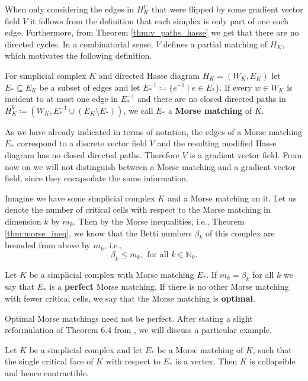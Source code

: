 When only considering the edges in $H_K^V$ that were flipped by some gradient vector field $V$ it follows from the definition that each simplex is only part of one such edge. Furthermore, from Theorem \ref{thm:v_paths_hasse} we get that there are no directed cycles. In a combinatorial sense, $V$ defines a partial matching of $H_K$, which motivates the following definition.

\begin{defi}
For simplicial complex $K$ and directed Hasse diagram $H_K = (W_K, E_K)$ let $E_* \subseteq E_K$ be a subset of edges and let $E_*^{-1} \coloneqq \{e^{-1} \mid e \in E_*\}$. If every $w \in W_K$ is incident to at most one edge in $E_*^{-1}$ and there are no closed directed paths in $H_K^V \coloneqq (W_K, E_*^{-1} \cup (E_K \setminus E_*) )$, we call $E_*$ a \textbf{Morse matching} of $K$.
\end{defi}

As we have already indicated in terms of notation, the edges of a Morse matching $E_*$ correspond to a discrete vector field $V$ and the resulting modified Hasse diagram has no closed directed paths. Therefore $V$ is a gradient vector field. From now on we will not distinguish between a Morse matching and a gradient vector field, since they encapsulate the same information. 

Imagine we have some simplicial complex $K$ and a Morse matching on it. Let us denote the number of critical cells with respect to the Morse matching in dimension $k$ by $m_k$. Then by the Morse inequalities, i.e., Theorem \ref{thm:morse_ineq}, we know that the Betti numbers $\beta_k$ of this complex are bounded from above by $m_k$, i.e., \[
\beta_k \leq m_k, \text{ for all }  k \in \mathbb{N}_0.
\]

\begin{defi}
Let $K$ be a simplicial complex with Morse matching $E_*$. If $m_k = \beta_k$ for all $k$ we say that $E_*$ is a \textbf{perfect} Morse matching. If there is no other Morse matching with fewer critical cells, we say that the Morse matching is \textbf{optimal}.
\end{defi}

Optimal Morse matchings need not be perfect. After stating a slight reformulation of Theorem 6.4 from \cite{Morse+Users+Guide}, we will discuss a particular example.

\begin{thm}
\label{thm:matching_collapse}
Let $K$ be a simplicial complex and let $E_*$ be a Morse matching of $K$, such that the single critical face of $K$ with respect to $E_*$ is a vertex. Then $K$ is collapsible and hence contractible.
\end{thm}

